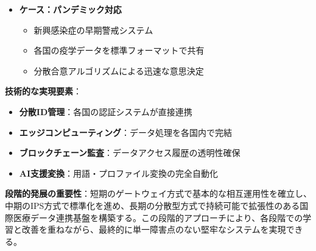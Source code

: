 \documentclass[
  a4paper,
  a4paper,
  11pt]{ltjsbook}
\providecommand{\tightlist}{%
  \setlength{\itemsep}{0pt}\setlength{\parskip}{0pt}}
\begin{document}
\begin{enumerate}
\begin{itemize}
    \begin{itemize}
    \tightlist
    \item
      希少疾患の国際共同研究
    \item
      各国が自国データを保持したまま参加
    \item
      標準化されたクエリで統計的分析を実施
    \end{itemize}
  \item
    \textbf{ケース：パンデミック対応}

    \begin{itemize}
    \tightlist
    \item
      新興感染症の早期警戒システム
    \item
      各国の疫学データを標準フォーマットで共有
    \item
      分散合意アルゴリズムによる迅速な意思決定
    \end{itemize}
  \end{itemize}
\end{enumerate}

\textbf{技術的な実現要素}：

\begin{itemize}
\tightlist
\item
  \textbf{分散ID管理}：各国の認証システムが直接連携
\item
  \textbf{エッジコンピューティング}：データ処理を各国内で完結
\item
  \textbf{ブロックチェーン監査}：データアクセス履歴の透明性確保
\item
  \textbf{AI支援変換}：用語・プロファイル変換の完全自動化
\end{itemize}

\begin{tcolorbox}[enhanced jigsaw, toprule=.15mm, bottomtitle=1mm, coltitle=black, left=2mm, opacityback=0, arc=.35mm, colbacktitle=quarto-callout-note-color!10!white, colback=white, opacitybacktitle=0.6, bottomrule=.15mm, rightrule=.15mm, breakable, title=\textcolor{quarto-callout-note-color}{\faInfo}\hspace{0.5em}{Note}, toptitle=1mm, titlerule=0mm, colframe=quarto-callout-note-color-frame, leftrule=.75mm]

\textbf{段階的発展の重要性}：短期のゲートウェイ方式で基本的な相互運用性を確立し、中期のIPS方式で標準化を進め、長期の分散型方式で持続可能で拡張性のある国際医療データ連携基盤を構築する。この段階的アプローチにより、各段階での学習と改善を重ねながら、最終的に単一障害点のない堅牢なシステムを実現できる。

\end{tcolorbox}
\end{document}
